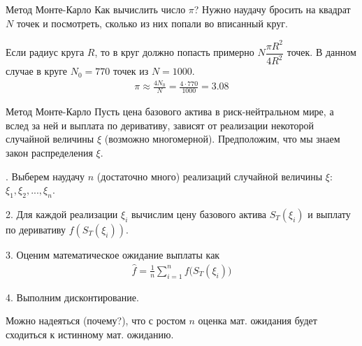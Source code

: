 \documentclass{beamer}
\begin{document}
\begin{frame}{Метод Монте-Карло}
\justify
Как вычислить число $\pi$? Нужно наудачу бросить на квадрат $N$ точек и посмотреть, сколько из них попали во вписанный круг. 

\centering
{}
\justify
Если радиус круга $R$, то в круг должно попасть примерно $N\dfrac{\pi R^2}{4R^2}$ точек. В данном случае в круге $N_0=770$ точек из $N=1000$. 
\begin{align*}
\pi \approx \frac{4N_0}{N} = \frac{4 \cdot 770}{1000} = 3.08
\end{align*}
\end{frame}



\begin{frame}{Метод Монте-Карло}
\justify
Пусть цена базового актива в риск-нейтральном мире, а вслед за ней и выплата по деривативу, зависят от реализации некоторой случайной величины $\xi$ (возможно многомерной). Предположим, что мы знаем закон распределения $\xi$.

. Выберем наудачу $n$ (достаточно много) реализаций случайной величины $\xi$: $\xi_1, \xi_2, ..., \xi_n$.

2. Для каждой реализации $\xi_i$ вычислим цену базового актива $S_T(\xi_i)$ и выплату по деривативу $f(S_T(\xi_i))$.

3. Оценим математическое ожидание выплаты как 
\begin{align*}
\hat{f} = \frac{1}{n}\sum\limits_{i=1}^{n}f\Big(S_T(\xi_i)\Big)
\end{align*}

4. Выполним дисконтирование.

\justify
Можно надеяться (почему?), что с ростом $n$ оценка мат. ожидания будет сходиться к истинному мат. ожиданию.
\end{frame}
\end{document}
